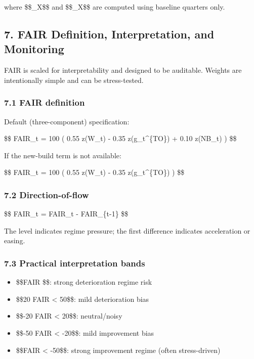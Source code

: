 where \$\$\mu\_X\$\$ and \$\$\sigma\_X\$\$ are computed using baseline
quarters only.

\subsection{7. FAIR Definition, Interpretation, and
Monitoring}\label{fair-definition-interpretation-and-monitoring}

FAIR is scaled for interpretability and designed to be auditable.
Weights are intentionally simple and can be stress-tested.

\subsubsection{7.1 FAIR definition}\label{fair-definition}

Default (three-component) specification:

\$\$ FAIR\_t = 100 \cdot \Big( 0.55 \cdot z(W\_t) - 0.35
\cdot z(g\_t\^{}\{TO\}) + 0.10 \cdot z(\Delta NB\_t) \Big) \$\$

If the new-build term is not available:

\$\$ FAIR\_t = 100 \cdot \Big( 0.55 \cdot z(W\_t) - 0.35
\cdot z(g\_t\^{}\{TO\}) \Big) \$\$

\subsubsection{7.2 Direction-of-flow}\label{direction-of-flow}

\$\$ \Delta FAIR\_t = FAIR\_t - FAIR\_\{t-1\} \$\$

The level indicates regime pressure; the first difference indicates
acceleration or easing.

\subsubsection{7.3 Practical interpretation
bands}\label{practical-interpretation-bands}

\begin{itemize}
\tightlist
\item
  \$\$FAIR \$\$: strong deterioration regime risk
\item
  \$\$20 \le FAIR \textless{} 50\$\$: mild deterioration bias
\item
  \$\$-20 \le FAIR \textless{} 20\$\$: neutral/noisy
\item
  \$\$-50 \le FAIR \textless{} -20\$\$: mild improvement bias
\item
  \$\$FAIR \textless{} -50\$\$: strong improvement regime (often
  stress-driven)
\end{itemize}


